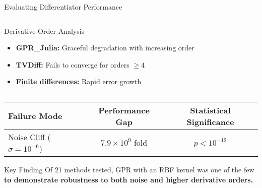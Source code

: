 \documentclass[aspectratio=169]{beamer}
\begin{document}
\begin{frame}{Evaluating Differentiator Performance}
\begin{columns}[t]
\begin{column}{0.48\textwidth}
      \vspace{0.5em}
      
      \vspace{0.5em}
      \begin{block}{\small Derivative Order Analysis}
        \tiny
        \begin{itemize}
          \item \textbf{GPR\_Julia:} Graceful degradation with increasing order
          \item \textbf{TVDiff:} Fails to converge for orders $\geq 4$
          \item \textbf{Finite differences:} Rapid error growth
        \end{itemize}
      \end{block}
    \end{column}
    
  \end{columns}
  
  \vspace{0.5em}
  
  \begin{center}
    \small
    \begin{tabular}{@{}lcc@{}}
      \toprule
      \textbf{Failure Mode} & \textbf{Performance Gap} & \textbf{Statistical Significance} \\
      \midrule
      Noise Cliff ($\sigma = 10^{-6}$) & $7.9 \times 10^9$ fold & $p < 10^{-12}$ \\
      \bottomrule
    \end{tabular}
  \end{center}
  
  \vspace{0.3em}
  \begin{alertblock}{Key Finding}
    \centering
    \footnotesize
    Of 21 methods tested, GPR with an RBF kernel was one of the few \\
    \textbf{to demonstrate robustness to both noise and higher derivative orders.}
  \end{alertblock}
  
\end{frame}
\end{document}
